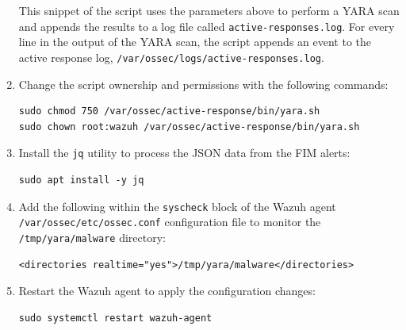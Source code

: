 \begin{enumerate}
This snippet of the script uses the parameters above to perform a YARA scan and appends the results to a log file called \texttt{active-responses.log}. For every line in the output of the YARA scan, the script appends an event to the active response log, \texttt{/var/ossec/logs/active-responses.log}.
    \item Change the script ownership and permissions with the following commands:
    \begin{verbatim}
sudo chmod 750 /var/ossec/active-response/bin/yara.sh
sudo chown root:wazuh /var/ossec/active-response/bin/yara.sh
    \end{verbatim}

    \item Install the \texttt{jq} utility to process the JSON data from the FIM alerts:
    \begin{verbatim}
sudo apt install -y jq
    \end{verbatim}

    \item Add the following within the \texttt{\textlangle syscheck\textrangle} block of the Wazuh agent \texttt{/var/ossec/etc/ossec.conf} configuration file to monitor the \texttt{/tmp/yara/malware} directory:
    \begin{verbatim}
<directories realtime="yes">/tmp/yara/malware</directories>
    \end{verbatim}

    \item Restart the Wazuh agent to apply the configuration changes:
    \begin{verbatim}
sudo systemctl restart wazuh-agent
    \end{verbatim}
\end{enumerate}

